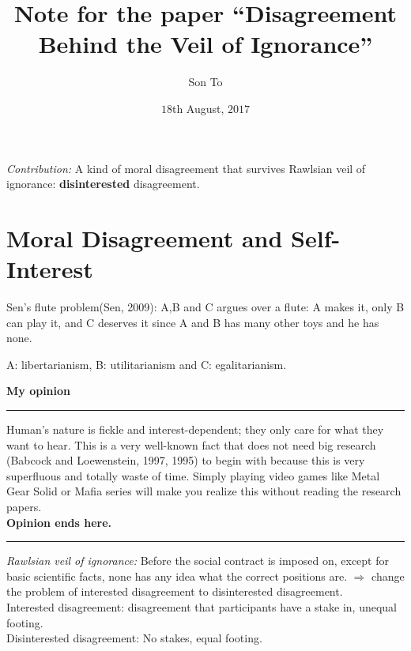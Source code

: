 \documentclass[a4paper,11pt]{article}
\newcommand{\note}[1]{\textsl{#1}}
\newcommand{\bold}[1]{\textbf{#1}}
\begin{document}
  \title{Note for the paper ``Disagreement
  Behind the Veil of Ignorance''}
  \author{Son To}
  \date{$18$th August, $2017$}

  \maketitle

  \note{Contribution:} A kind of moral disagreement
  that survives Rawlsian veil of ignorance: \bold{%
  disinterested} disagreement.
  \section{Moral Disagreement and Self-Interest}
  Sen's flute problem(Sen, 2009): A,B and C argues over a
  flute: A makes it, only B can play it, and C deserves it
  since A and B has many other toys and he has none.
  \par
  \smallskip
  A: libertarianism, B: utilitarianism and C: egalitarianism.

  \medskip
  \bold{My opinion} \rule{10cm}{0.4pt}
  Human's nature is fickle and interest-dependent; they
  only care for what they want to hear.
  This is a very well-known fact that does not need big research
  (Babcock and Loewenstein, 1997, 1995)
  to begin with because this is very superfluous and totally
  waste of time. Simply playing video games like Metal Gear
  Solid or Mafia series will make you realize this without
  reading the research papers.
  \\
  \bold{Opinion ends here.}\rule{10cm}{0.4pt}
  \par
  \medskip
  \note{Rawlsian veil of ignorance:}
  Before the social contract is
  imposed on, except for basic scientific facts, none has
  any idea what the correct positions are.
  $\Rightarrow$ change the problem of interested disagreement
  to disinterested disagreement.\\
  Interested disagreement: disagreement that participants
  have a stake in, unequal footing.
  \\
  Disinterested disagreement: No stakes, equal footing.
\end{document}
